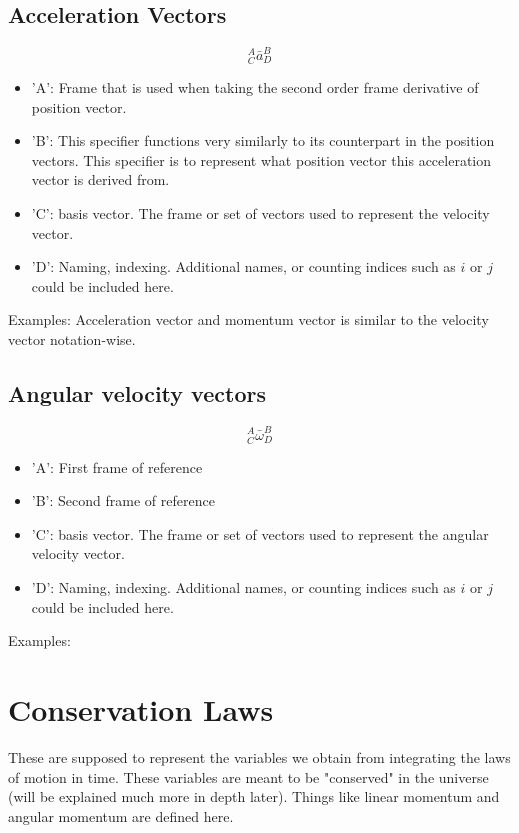 \subsection{Acceleration Vectors}
\begin{comment}
\end{comment}
$${}^{A}_{C}\bar{a}^{B}_{D}$$
\begin{itemize}
    \item 'A': Frame that is used when taking the second order frame derivative of position vector.
    \item 'B': This specifier functions very similarly to its counterpart in the position vectors. This specifier is to represent what position vector this acceleration vector is derived from.
    \item 'C': basis vector. The frame or set of vectors used to represent the velocity vector.
    \item 'D': Naming, indexing. Additional names, or counting indices such as $i$ or $j$ could be included here.
\end{itemize}
Examples:
Acceleration vector and momentum vector is similar to the velocity vector notation-wise.
\subsection{Angular velocity vectors}
\begin{comment}
\end{comment}
$${}^{A}_{C}\bar{\omega}^{B}_{D}$$
\begin{itemize}
    \item 'A': First frame of reference
    \item 'B': Second frame of reference
    \item 'C': basis vector. The frame or set of vectors used to represent the angular velocity vector.
    \item 'D': Naming, indexing. Additional names, or counting indices such as $i$ or $j$ could be included here.
\end{itemize}
Examples:
\section{Conservation Laws}
\begin{comment}
\end{comment}
These are supposed to represent the variables we obtain from integrating the laws of motion in time.
These variables are meant to be "conserved" in the universe (will be explained much more in depth later).
Things like linear momentum and angular momentum are defined here.
